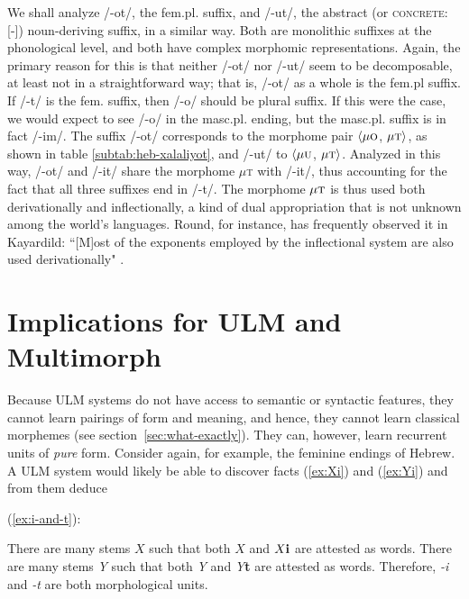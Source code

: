  We shall analyze /-ot/, the fem.pl. suffix, and /-ut/, the abstract (or \textsc{concrete:}[-])
 noun-deriving suffix, in a similar way. Both are monolithic suffixes at the phonological
 level, and both have complex morphomic representations. Again, the primary reason for this
 is that neither /-ot/ nor /-ut/ seem to be decomposable, at least not in a straightforward
 way; that is, /-ot/ as a whole is the fem.pl suffix. If /-t/ is the fem. suffix, then
 /-o/ should be plural suffix. If this were the case, we would expect to see
 /-o/ in the masc.pl. ending, but the masc.pl. suffix is in fact /-im/. The suffix /-ot/
 corresponds to the morphome pair $\langle \mu\textsc{o}$, $\mu\textsc{t} \rangle$, 
 as shown in table \ref{subtab:heb-xalaliyot}, and /-ut/ to $\langle \mu\textsc{u}$, 
 $\mu\textsc{t} \rangle$. Analyzed in this way, /-ot/ and /-it/ share the morphome 
 $\mu$\textsc{t} with /-it/, thus accounting for the fact that all three suffixes end 
 in /-t/. The morphome $\mu\textsc{t}$ is thus used both derivationally and 
 inflectionally, a kind of dual appropriation that is not unknown among the world's languages. 
 Round, for instance, has frequently observed it in Kayardild: ``[M]ost of the exponents 
 employed by the inflectional system are also used derivationally" \citep[][p. 13]{round:2015}.

\section{Implications for \ac{ULM} and Multimorph}

Because \ac{ULM} systems do not have access to
semantic or syntactic features, they cannot learn pairings of form and meaning, 
and hence, they cannot learn classical morphemes (see section~\ref{sec:what-exactly}). 
They can, however, learn recurrent units of \emph{pure} form. 
Consider again, 
for example, the feminine endings of Hebrew. A \ac{ULM} system would likely be 
able to discover facts (\ref{ex:Xi}) and (\ref{ex:Yi}) and from them deduce 

(\ref{ex:i-and-t}): 
\begin{exe} \label{ex:observations1}
\ex There are many stems $X$ such that both $X$ and $X\text{\textbf{i}}$ are 
attested as words. \label{ex:Xi}
 \ex There are many stems \textit{Y} such that both \textit{Y} and \textit{Y}\textbf{t} 
 are attested as words. \label{ex:Yi}
\ex Therefore, \textit{-i} and \textit{-t} are both morphological units. \label{ex:i-and-t}
\end{exe}

